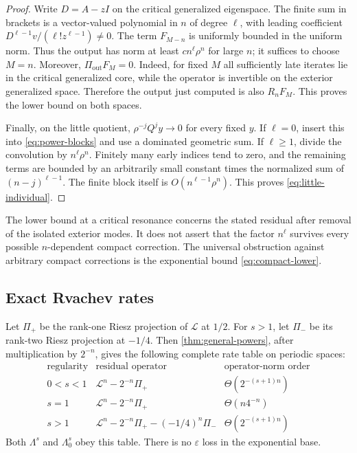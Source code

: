 \documentclass[11pt,a4paper]{article}
\numberwithin{equation}{section}
\theoremstyle{definition}
\theoremstyle{remark}
\newcommand{\Ll}{\mathcal L}
\newcommand{\smallspace}{\Lambda_0}
\begin{document}
\begin{proof}
Write $D=A-zI$ on the critical generalized eigenspace. The finite sum
in brackets is a vector-valued polynomial in $n$ of degree $\ell$,
with leading coefficient
$D^{\ell-1}v/(\ell!z^{\ell-1})\ne0$. The term $F_{M-n}$ is
uniformly bounded in the uniform norm. Thus the output has norm at
least $c n^\ell\rho^n$ for large $n$; it suffices to choose $M=n$.
Moreover, $\Pi_{\mathrm{out}}F_M=0$. Indeed, for fixed $M$ all
sufficiently late iterates lie in the critical generalized core, while
the operator is invertible on the exterior generalized space. Therefore
the output just computed is also $R_nF_M$. This proves the lower bound
on both spaces.

Finally, on the little quotient,
$\rho^{-j}Q^jy\to0$ for every fixed $y$. If $\ell=0$, insert this
into \eqref{eq:power-blocks} and use a dominated geometric sum. If
$\ell\ge1$, divide the convolution by $n^\ell\rho^n$. Finitely
many early indices tend to zero, and the remaining terms are bounded
by an arbitrarily small constant times the normalized sum of
$(n-j)^{\ell-1}$. The finite block itself is
$O(n^{\ell-1}\rho^n)$. This proves
\eqref{eq:little-individual}.
\end{proof}

The lower bound at a critical resonance concerns the stated residual
after removal of the isolated exterior modes. It does not assert that
the factor $n^\ell$ survives every possible $n$-dependent compact
correction. The universal obstruction against arbitrary compact
corrections is the exponential bound \eqref{eq:compact-lower}.

\subsection{Exact Rvachev rates}
Let $\Pi_+$ be the rank-one Riesz projection of $\Ll$ at $1/2$.
For $s>1$, let $\Pi_-$ be its rank-two Riesz projection at $-1/4$.
Then \cref{thm:general-powers}, after multiplication by $2^{-n}$,
gives the following complete rate table on periodic spaces:
\begin{equation}
\begin{array}{c|c|c}
\text{regularity}&\text{residual operator}&\text{operator-norm order}\\
\hline
0<s<1&\Ll^n-2^{-n}\Pi_+&\Theta(2^{-(s+1)n})\\[2pt]
s=1&\Ll^n-2^{-n}\Pi_+&\Theta(n4^{-n})\\[2pt]
s>1&\Ll^n-2^{-n}\Pi_+-(-1/4)^n\Pi_-&\Theta(2^{-(s+1)n})
\end{array}
\label{eq:rate-table}
\end{equation}
Both $\Lambda^s$ and $\smallspace^s$ obey this table. There is no
$\varepsilon$ loss in the exponential base.
\end{document}

